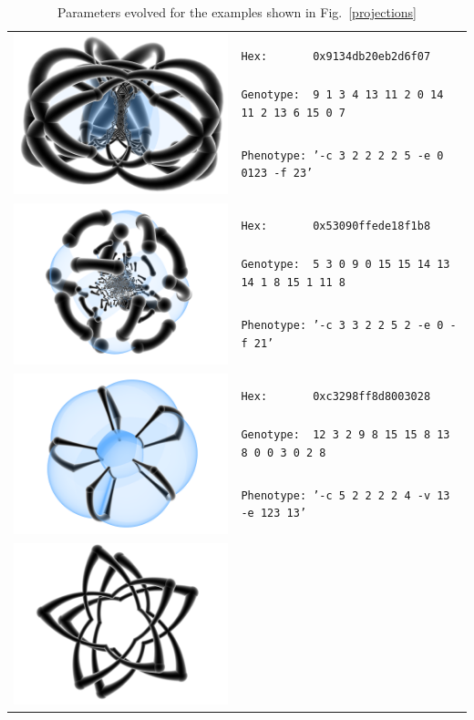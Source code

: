 \documentclass{article}
\begin{document}
\begin{center}
	\begin{table}[h!!t]
	\caption{Parameters evolved for the examples shown in Fig.~\ref{projections}}
	\begin{tabular}{|l|l|}
		\hline
		\multirow{5}{*}{\includegraphics[width = .12\textwidth]{../Examples/0x9134db20eb2d6f07.png}}
		& \\
		& \texttt{Hex:\ \ \ \ \ \ \ 0x9134db20eb2d6f07}\\
		& \texttt{Genotype:\ \ 9 1 3 4 13 11 2 0 14 11 2 13 6 15 0 7}\\
		& \texttt{Phenotype:\ '-c 3 2 2 2 2 5  -e 0 0123 -f 23'}\\
		& \\
		\hline
		\multirow{5}{*}{\includegraphics[width = .12\textwidth]{../Examples/0x53090ffede18f1b8.png}}
		& \\
		& \texttt{Hex:\ \ \ \ \ \ \ 0x53090ffede18f1b8}\\
		& \texttt{Genotype:\ \ 5 3 0 9 0 15 15 14 13 14 1 8 15 1 11 8}\\
		& \texttt{Phenotype:\ '-c 3 3 2 2 5 2  -e 0 -f 21'}\\
		& \\
		\hline
		\multirow{5}{*}{\includegraphics[width = .12\textwidth]{../Examples/0xc3298ff8d8003028.png}}
		& \\
		& \texttt{Hex:\ \ \ \ \ \ \ 0xc3298ff8d8003028}\\
		& \texttt{Genotype:\ \ 12 3 2 9 8 15 15 8 13 8 0 0 3 0 2 8}\\
		& \texttt{Phenotype:\ '-c 5 2 2 2 2 4 -v 13 -e 123 13'}\\
		& \\
		\hline
		\multirow{5}{*}{\includegraphics[width = .12\textwidth]{../Examples/0xc3090fe89c10f098.png}}
		& \\

\end{tabular}
\end{table}
\end{center}
\end{document}
